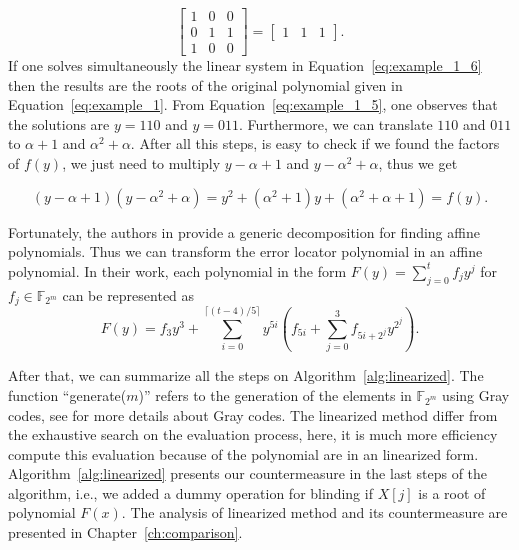 \begin{example}
\begin{equation}
    \begin{bmatrix}
    1 & 0 & 0 \\
    0 & 1 & 1 \\
    1 & 0 & 0
    \end{bmatrix}
    =
    \begin{bmatrix} 1 & 1 & 1 \end{bmatrix}.
\end{equation}
If one solves simultaneously the linear system in Equation~\ref{eq:example_1_6} then the results are the roots of the original polynomial given in Equation~\ref{eq:example_1}. From Equation~\ref{eq:example_1_5}, one observes that the solutions are $y=110$ and $y=011$. Furthermore, we can translate $110$ and $011$ to $\alpha + 1$ and $\alpha^2 + \alpha$. After all this steps, is easy to check if we found the factors of $f(y)$, we just need to multiply $y - \alpha + 1$ and $y- \alpha^2 + \alpha$, thus we get

\begin{equation*}\label{eq:example_1_7}
    (y - \alpha + 1) (y - \alpha^2 + \alpha) = y^2 + (\alpha^2+1)y + (\alpha^2 +\alpha +1) = f(y).
\end{equation*}
\end{example}

Fortunately, the authors in \cite{fedorenko2002finding} provide a generic decomposition for finding affine polynomials. Thus we can transform the error locator polynomial in an affine polynomial. In their work, each polynomial in the form $F(y) = \sum_{j=0}^{t} f_jy^j$ for $f_j \in \mathbb{F}_{2^m}$ can be represented as
\begin{equation}
\label{eq:f_y}
    F(y) = f_3y^3 + \sum_{i=0}^{\lceil (t-4)/5 \rceil} y^{5i}(f_{5i} + \sum_{j=0}^{3} f_{5i+2^j}y^{2^j}).
\end{equation}

After that, we can summarize all the steps on Algorithm~\ref{alg:linearized}. The function ``generate($m$)'' refers to the generation of the elements in $\mathbb{F}_{2^m}$ using Gray codes, see \cite{savage1997survey} for more details about Gray codes. The linearized method differ from the exhaustive search on the evaluation process, here, it is much more efficiency compute this evaluation because of the polynomial are in an linearized form. Algorithm~\ref{alg:linearized} presents our countermeasure in the last steps of the algorithm, i.e., we added a dummy operation for blinding if $X[j]$ is a root of polynomial $F(x)$. The analysis of linearized method and its countermeasure are presented in Chapter~\ref{ch:comparison}.

